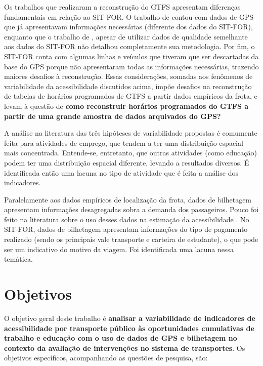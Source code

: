 \documentclass[        
    a4paper,          %
    12pt,             %
    chapter=TITLE,    %
    section=Title,    %
    subsection=Title, %
    oneside,          %
    english,          %
    spanish,          %
    brazil,           %
    fleqn             %
]{abntex2}
\begin{document}
  Os trabalhos que realizaram a reconstrução do GTFS apresentam diferenças fundamentais em relação ao SIT-FOR. O trabalho de \citet{Wessel2017} contou com dados de GPS que já apresentavam informações necessárias (diferente dos dados do SIT-FOR), enquanto que o trabalho de \citet{Arbex2016a}, apesar de utilizar dados de qualidade semelhante aos dados do SIT-FOR não detalhou completamente sua metodologia. Por fim, o SIT-FOR conta com algumas linhas e veículos que tiveram que ser descartadas da base do GPS porque não apresentaram todas as informações necessárias, trazendo maiores desafios à reconstrução. Essas considerações, somadas aos fenômenos de variabilidade da acessibilidade discutidos acima, impõe desafios na reconstrução de tabelas de horários programados de GTFS a partir dados empíricos da frota, e levam à questão de \textbf{como reconstruir horários programados do GTFS a partir de uma grande amostra de dados arquivados do GPS?}
  
  A análise na literatura das três hipóteses de variabilidade propostas é comumente feita para atividades de emprego, que tendem a ter uma distribuição espacial mais concentrada. Entende-se, entretanto, que outras atividades (como educação) podem ter uma distribuição espacial diferente, levando a resultados diversos. É identificada então uma lacuna no tipo de atividade que é feita a análise dos indicadores.
  
  Paralelamente aos dados empíricos de localização da frota, dados de bilhetagem apresentam informações desagregadas sobra a demanda dos passageiros. Pouco foi feito na literatura sobre o uso desses dados na estimação da acessibilidade \citep{Arbex2016a}. No SIT-FOR, dados de bilhetagem apresentam informações do tipo de pagamento realizado (sendo os principais vale transporte e carteira de estudante), o que pode ser um indicativo do motivo da viagem. Foi identificada uma lacuna nessa temática.
  
  \hypertarget{objetivos}{%
  \section{Objetivos}\label{objetivos}}
  
  O objetivo geral deste trabalho é \textbf{analisar a variabilidade de indicadores de acessibilidade por transporte público às oportunidades cumulativas de trabalho e educação com o uso de dados de GPS e bilhetagem no contexto da avaliação de intervenções no sistema de transportes}. Os objetivos específicos, acompanhando as questões de pesquisa, são:
  
\end{document}
